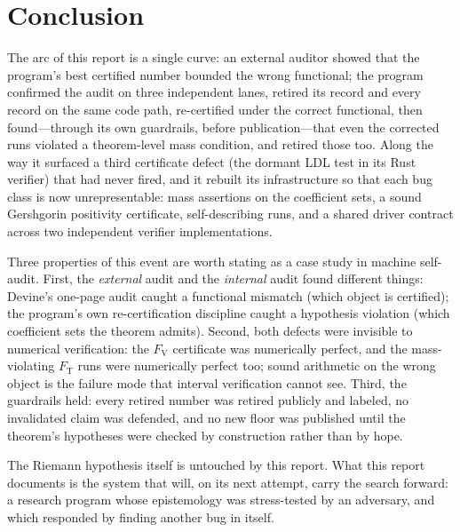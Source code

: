 \documentclass[11pt]{article}
\newcommand{\Fv}{F_{\mathrm{V}}}
\newcommand{\Ft}{F_{\mathrm{T}}}
\begin{document}
\section{Conclusion}
\label{sec:conclusion}

The arc of this report is a single curve: an external auditor showed that the
program's best certified number bounded the wrong functional; the program
confirmed the audit on three independent lanes, retired its record and every
record on the same code path, re-certified under the correct functional, then
found---through its own guardrails, before publication---that even the corrected
runs violated a theorem-level mass condition, and retired those too. Along the
way it surfaced a third certificate defect (the dormant LDL test in its Rust
verifier) that had never fired, and it rebuilt its infrastructure so that each
bug class is now unrepresentable: mass assertions on the coefficient sets,
a sound Gershgorin positivity certificate, self-describing runs, and a shared
driver contract across two independent verifier implementations.

Three properties of this event are worth stating as a case study in machine
self-audit. First, the \emph{external} audit and the \emph{internal} audit
found different things: Devine's one-page audit caught a functional mismatch
(which object is certified); the program's own re-certification discipline
caught a hypothesis violation (which coefficient sets the theorem admits).
Second, both defects were invisible to numerical verification: the $\Fv$
certificate was numerically perfect, and the mass-violating $\Ft$ runs were
numerically perfect too; sound arithmetic on the wrong object is the failure
mode that interval verification cannot see. Third, the guardrails held: every
retired number was retired publicly and labeled, no invalidated claim was
defended, and no new floor was published until the theorem's hypotheses were
checked by construction rather than by hope.

The Riemann hypothesis itself is untouched by this report. What this report
documents is the system that will, on its next attempt, carry the search
forward: a research program whose epistemology was stress-tested by an
adversary, and which responded by finding another bug in itself.
\end{document}
